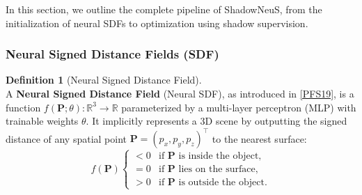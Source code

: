 \documentclass[12pt]{article}
\theoremstyle{definition}
\newtheorem{definition}{Definition}[subsection]
\begin{document}
In this section, we outline the complete pipeline of ShadowNeuS, from the initialization of neural SDFs to optimization using shadow supervision.

\subsubsection{Neural Signed Distance Fields (SDF)} \label{sec:neural_sdf}

\begin{definition}[Neural Signed Distance Field] \label{def:neural_sdf} ~\\
A \textbf{Neural Signed Distance Field} (Neural SDF), as introduced in \hyperlink{[PFS19]}{[PFS19]}, is a function $f(\mathbf{P}; \theta): \mathbb{R}^3 \to \mathbb{R}$ parameterized by a multi-layer perceptron (MLP) with trainable weights $\theta$. It implicitly represents a 3D scene by outputting the signed distance of any spatial point $\mathbf{P} = (p_x, p_y, p_z)^\top$ to the nearest surface:
\[
f(\mathbf{P})
\begin{cases}
< 0 & \text{if } \mathbf{P} \text{ is inside the object}, \\
= 0 & \text{if } \mathbf{P} \text{ lies on the surface}, \\
> 0 & \text{if } \mathbf{P} \text{ is outside the object}.
\end{cases}
\]
\end{definition}
\end{document}
